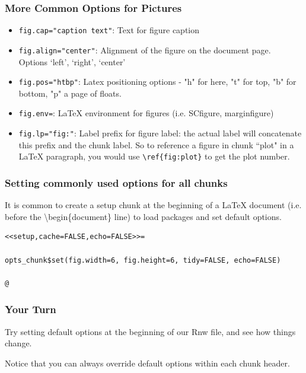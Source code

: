 \documentclass{beamer}\usepackage[]{graphicx}\usepackage[]{color}
\begin{document}

\begin{frame}[fragile]
\frametitle{More Common Options for Pictures}
\begin{itemize}
\item \texttt{fig.cap="caption text"}: Text for figure caption
\item \texttt{fig.align="center"}: Alignment of the figure on the document page.\\ Options `left', `right', `center'
\item \texttt{fig.pos="htbp"}: Latex positioning options - "h" for here, "t" for top, "b" for bottom, "p" a page of floats. 
\item \texttt{fig.env=}: LaTeX environment for figures (i.e. SCfigure, marginfigure)
\item \texttt{fig.lp="fig:"}: Label prefix for figure label: the actual label will concatenate this prefix and the chunk label. So to reference a figure in chunk ``plot" in a LaTeX paragraph, you would use \verb|\ref{fig:plot}| to get the plot number. 
\end{itemize}
\end{frame}


\begin{frame}[fragile]
\frametitle{Setting commonly used options for all chunks}
It is common to create a setup chunk at the beginning of a LaTeX document (i.e. before the \textbackslash begin\{document\} line) to load packages and set default options. 

\begin{verbatim}
<<setup,cache=FALSE,echo=FALSE>>=

opts_chunk$set(fig.width=6, fig.height=6, tidy=FALSE, echo=FALSE)

@
\end{verbatim}
\end{frame}


\begin{frame}
\frametitle{Your Turn}

Try setting default options at the beginning of our Rnw file, and see how things change. \bigskip\bigskip

Notice that you can always override default options within each chunk header.

\end{frame}

\end{document}

